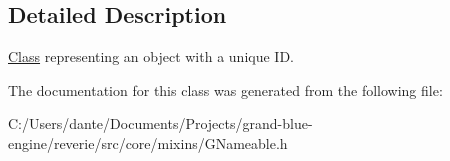 \subsection{Detailed Description}
\mbox{\hyperlink{struct_class}{Class}} representing an object with a unique ID. 

The documentation for this class was generated from the following file\+:\begin{DoxyCompactItemize}
\item 
C\+:/\+Users/dante/\+Documents/\+Projects/grand-\/blue-\/engine/reverie/src/core/mixins/G\+Nameable.\+h\end{DoxyCompactItemize}
